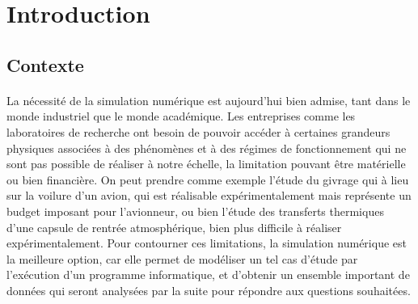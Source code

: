 

\maketitle

\section{Introduction}

	\subsection{Contexte}

		\paragraph{} La nécessité de la simulation numérique est aujourd'hui bien admise, tant dans le monde industriel que le monde académique.
		Les entreprises comme les laboratoires de recherche ont besoin de pouvoir accéder à certaines grandeurs physiques associées à des phénomènes et à des régimes de fonctionnement qui ne sont pas possible de réaliser à notre échelle, la limitation pouvant être matérielle ou bien financière.
		On peut prendre comme exemple l'étude du givrage qui à lieu sur la voilure d'un avion, qui est réalisable expérimentalement mais représente un budget imposant pour l’avionneur, ou bien l'étude des transferts thermiques d'une capsule de rentrée atmosphérique, bien plus difficile à réaliser expérimentalement.
		Pour contourner ces limitations, la simulation numérique est la meilleure option, car elle permet de modéliser un tel cas d'étude par l’exécution d'un programme informatique, et d'obtenir un ensemble important de données qui seront analysées par la suite pour répondre aux questions souhaitées.

